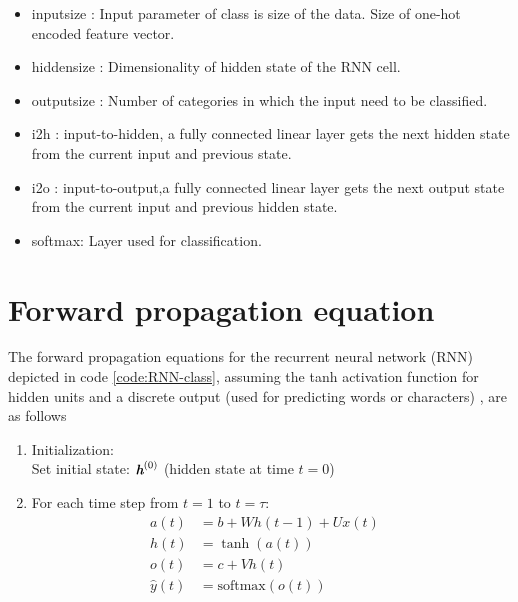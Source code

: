 \begin{itemize}
    \item input\textunderscore size : Input parameter of class is size of the data. Size of one-hot encoded feature vector. 
    \item  hidden\textunderscore size : Dimensionality of hidden state of the \acs{RNN} cell.
    \item  output\textunderscore size : Number of categories in which the input need to be classified.
    \item i2h : input-to-hidden, a fully connected linear layer gets the next hidden state from the current input and previous state.
    \item i2o : input-to-output,a fully connected linear layer gets the next output state from the current input and previous hidden state.
    \item softmax: Layer used for classification. 
\end{itemize}

\section{Forward propagation equation}
The forward propagation equations for the recurrent neural network (RNN) depicted in code \ref{code:RNN-class}, assuming the tanh activation function for hidden units and a discrete output (used for predicting words or characters) \parencite{Goodfellow-et-al-2016}, are as follows
\begin{enumerate}
    \item Initialization: \\
    Set initial state: $\textit{\textbf{h}}^{(0)}$ (hidden state at time $t=0$)
    \item For each time step from $t=1$ to $t=\tau$: \\
    \begin{align}
        a(t) &= b + Wh(t-1) + Ux(t) \quad  \\
        h(t) &= \tanh(a(t)) \quad  \\
        o(t) &= c + Vh(t) \quad  \\
        \hat{y}(t) &= \text{softmax}(o(t)) \quad 
        \end{align}
\end{enumerate}

